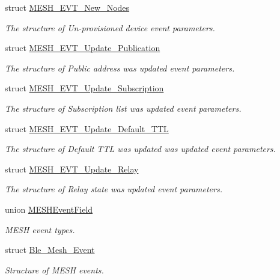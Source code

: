 \begin{DoxyCompactItemize}
struct \hyperlink{struct_m_e_s_h___e_v_t___new___nodes}{M\+E\+S\+H\+\_\+\+E\+V\+T\+\_\+\+New\+\_\+\+Nodes}
\begin{DoxyCompactList}\small\item\em The structure of Un-\/provisioned device event parameters. \end{DoxyCompactList}\item 
struct \hyperlink{struct_m_e_s_h___e_v_t___update___publication}{M\+E\+S\+H\+\_\+\+E\+V\+T\+\_\+\+Update\+\_\+\+Publication}
\begin{DoxyCompactList}\small\item\em The structure of Public address was updated event parameters. \end{DoxyCompactList}\item 
struct \hyperlink{struct_m_e_s_h___e_v_t___update___subscription}{M\+E\+S\+H\+\_\+\+E\+V\+T\+\_\+\+Update\+\_\+\+Subscription}
\begin{DoxyCompactList}\small\item\em The structure of Subscription list was updated event parameters. \end{DoxyCompactList}\item 
struct \hyperlink{struct_m_e_s_h___e_v_t___update___default___t_t_l}{M\+E\+S\+H\+\_\+\+E\+V\+T\+\_\+\+Update\+\_\+\+Default\+\_\+\+T\+TL}
\begin{DoxyCompactList}\small\item\em The structure of Default T\+TL was updated was updated event parameters. \end{DoxyCompactList}\item 
struct \hyperlink{struct_m_e_s_h___e_v_t___update___relay}{M\+E\+S\+H\+\_\+\+E\+V\+T\+\_\+\+Update\+\_\+\+Relay}
\begin{DoxyCompactList}\small\item\em The structure of Relay state was updated event parameters. \end{DoxyCompactList}\item 
union \hyperlink{union_m_e_s_h_event_field}{M\+E\+S\+H\+Event\+Field}
\begin{DoxyCompactList}\small\item\em M\+E\+SH event types. \end{DoxyCompactList}\item 
struct \hyperlink{struct_ble___mesh___event}{Ble\+\_\+\+Mesh\+\_\+\+Event}
\begin{DoxyCompactList}\small\item\em Structure of M\+E\+SH events. \end{DoxyCompactList}\item 

\end{DoxyCompactItemize}

